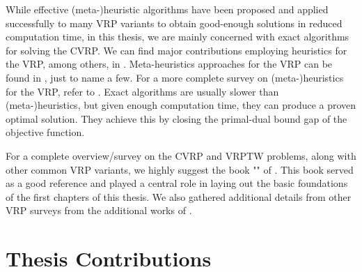 While effective (meta-)heuristic algorithms have been proposed and applied
successfully to many VRP variants to obtain good-enough solutions
in reduced computation time, in this thesis, we are mainly concerned
with exact algorithms for solving the CVRP.
We can find major contributions employing heuristics for the VRP, among others, in
\textcite{clarke1964, desrochers1989matching, paessens1988savings, foster1976integer}.
Meta-heuristics approaches for the VRP can be found in
\textcite{gendreau1994tabu, cordeau2012parallel, toth2003granular, li2005very, pisinger2007, kytojoki2007efficient, nagata2009,vidal2012, subramanian2013},
just to name a few.
For a more complete survey on (meta-)heuristics for the VRP, refer to
\textcite{golden1998impact,gendreau2002metaheuristics,gendreau2008,laporte2014chapter,elshaer2020taxonomic}.
Exact algorithms are usually slower than (meta-)heuristics, but given
enough computation time, they can produce a proven optimal solution.
They achieve this by closing the primal-dual bound gap of the objective function.

\medskip

For a complete overview/survey on the CVRP and VRPTW problems,
along with other common VRP variants,
we highly suggest the book "" of \textcite{toth2014}.
This book served as a good reference and played a central role
in laying out the basic foundations of the first chapters of this thesis.
We also gathered additional details from other VRP surveys from the additional works of
\textcite{cordeau2007, baldacci2012, caceres-cruz2015, costa2019}.

\section{Thesis Contributions}
\label{sec:intro-thesis-contributions}


